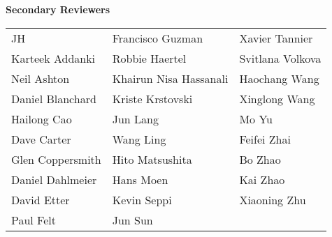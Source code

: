 \vspace{3mm}
{\bf Secondary Reviewers}\vspace{2mm} \\
\begin{tabular*}{\textwidth}{@{\extracolsep{\fill}} lll }
  JH  & Francisco Guzman  & Xavier Tannier \\
  Karteek Addanki  & Robbie Haertel  & Svitlana Volkova \\
  Neil Ashton  & Khairun Nisa Hassanali  & Haochang Wang \\
  Daniel Blanchard  & Kriste Krstovski  & Xinglong Wang \\
  Hailong Cao  & Jun Lang  & Mo Yu \\
  Dave Carter  & Wang Ling  & Feifei Zhai \\
  Glen Coppersmith  & Hito Matsushita  & Bo Zhao \\
  Daniel Dahlmeier  & Hans Moen  & Kai Zhao \\
  David Etter  & Kevin Seppi  & Xiaoning Zhu \\
  Paul Felt  & Jun Sun  &  \\
\end{tabular*}


